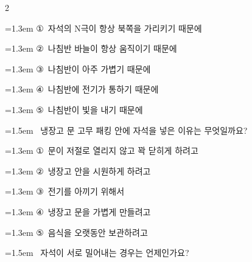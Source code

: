 \documentclass[12pt, a4paper]{article}
\begin{document}
\begin{multicols}{2}
\begin{minipage}{\columnwidth}
\vspace{0.5mm}
{\hangindent=1.3em  \noindent\hspace{0.3em}①~자석의 N극이 항상 북쪽을 가리키기 때문에\par}
{\hangindent=1.3em  \noindent\hspace{0.3em}②~나침반 바늘이 항상 움직이기 때문에\par}
{\hangindent=1.3em  \noindent\hspace{0.3em}③~나침반이 아주 가볍기 때문에\par}
{\hangindent=1.3em  \noindent\hspace{0.3em}④~나침반에 전기가 통하기 때문에\par}
{\hangindent=1.3em  \noindent\hspace{0.3em}⑤~나침반이 빛을 내기 때문에\par}
\vspace{4mm}
\end{minipage}
\par

\noindent\begin{minipage}{\columnwidth}
\vspace{2mm}
{\hangindent=1.5em  ~냉장고 문 고무 패킹 안에 자석을 넣은 이유는 무엇일까요?\par}

\vspace{0.5mm}
{\hangindent=1.3em  \noindent\hspace{0.3em}①~문이 저절로 열리지 않고 꽉 닫히게 하려고\par}
{\hangindent=1.3em  \noindent\hspace{0.3em}②~냉장고 안을 시원하게 하려고\par}
{\hangindent=1.3em  \noindent\hspace{0.3em}③~전기를 아끼기 위해서\par}
{\hangindent=1.3em  \noindent\hspace{0.3em}④~냉장고 문을 가볍게 만들려고\par}
{\hangindent=1.3em  \noindent\hspace{0.3em}⑤~음식을 오랫동안 보관하려고\par}
\vspace{4mm}
\end{minipage}
\par

\noindent\begin{minipage}{\columnwidth}
\vspace{2mm}
{\hangindent=1.5em  ~자석이 서로 밀어내는 경우는 언제인가요?\par}


\end{minipage}
\end{multicols}
\end{document}
